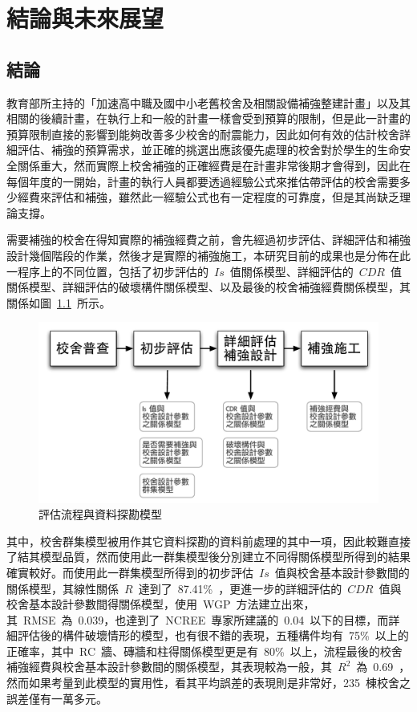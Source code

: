 \renewcommand\thetable{\arabic{chapter}-\arabic{table}}
\chapter{結論與未來展望}
\label{cha:conclusions}


\section{結論}

教育部所主持的「加速高中職及國中小老舊校舍及相關設備補強整建計畫」以及其相關的後續計畫，在執行上和一般的計畫一樣會受到預算的限制，但是此一計畫的預算限制直接的影響到能夠改善多少校舍的耐震能力，因此如何有效的估計校舍詳細評估、補強的預算需求，並正確的挑選出應該優先處理的校舍對於學生的生命安全關係重大，然而實際上校舍補強的正確經費是在計畫非常後期才會得到，因此在每個年度的一開始，計畫的執行人員都要透過經驗公式來推估帶評估的校舍需要多少經費來評估和補強，雖然此一經驗公式也有一定程度的可靠度，但是其尚缺乏理論支撐。

需要補強的校舍在得知實際的補強經費之前，會先經過初步評估、詳細評估和補強設計幾個階段的作業，然後才是實際的補強施工，本研究目前的成果也是分佈在此一程序上的不同位置，包括了初步評估的~$Is$~值關係模型、詳細評估的~$CDR$~值關係模型、詳細評估的破壞構件關係模型、以及最後的校舍補強經費關係模型，其關係如圖~\ref{fig:FLOW-con}~所示。

\begin{figure}[hbtp]
  \begin{center}
    \includegraphics[width=1.0\textwidth]{figures/survey-flow-con.pdf}
    \caption{評估流程與資料探勘模型} 
    \label{fig:FLOW-con}
  \end{center}
\end{figure}

其中，校舍群集模型被用作其它資料探勘的資料前處理的其中一項，因此較難直接了結其模型品質，然而使用此一群集模型後分別建立不同得關係模型所得到的結果確實較好。而使用此一群集模型所得到的初步評估~$Is$~值與校舍基本設計參數間的關係模型，其線性關係~$R$~達到了~87.41\%~，更進一步的詳細評估的~$CDR$~值與校舍基本設計參數間得關係模型，使用~WGP~方法建立出來，其~RMSE~為~0.039，也達到了~NCREE~專家所建議的~0.04~以下的目標，而詳細評估後的構件破壞情形的模型，也有很不錯的表現，五種構件均有~75\%~以上的正確率，其中~RC~牆、磚牆和柱得關係模型更是有~80\%~以上，流程最後的校舍補強經費與校舍基本設計參數間的關係模型，其表現較為一般，其~$R^2$~為~0.69~，然而如果考量到此模型的實用性，看其平均誤差的表現則是非常好，235~棟校舍之誤差僅有一萬多元。

